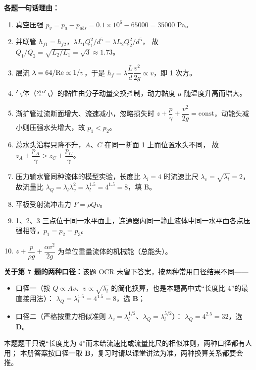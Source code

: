 \begin{tishi}
\textbf{各题一句话理由：}
\begin{enumerate}
  \item 真空压强 $p_v=p_a-p_{abs}=0.1\times10^6-65000=35000$ Pa。
  \item 并联管 $h_{f1}=h_{f2}$，$\lambda L_1Q_1^2/d^5=\lambda L_2Q_2^2/d^5$，
        故 $Q_1/Q_2=\sqrt{L_2/L_1}=\sqrt{3}\approx1.73$。
  \item 层流 $\lambda=64/\mathrm{Re}\propto1/v$，于是 $h_f=\lambda\dfrac{L}{d}\dfrac{v^2}{2g}\propto v$，即 1 次方。
  \item 气体（空气）的黏性由分子动量交换控制，动力黏度 $\mu$ 随温度升高而增大。
  \item 渐扩管过流断面增大、流速减小，忽略损失时
        $z+\dfrac{p}{\gamma}+\dfrac{v^2}{2g}=\text{const}$，动能头减小则压强水头增大，故 $p_1<p_2$。
  \item 总水头沿程只降不升，$A$、$C$ 在同一断面 1 上而位置水头不同，
        故 $z_A+\dfrac{p_A}{\gamma}>z_C+\dfrac{p_C}{\gamma}$。
  \item 压力输水管同种流体的模型实验，长度比 $\lambda_l=4$ 时流速比尺 $\lambda_v=\sqrt{\lambda_l}=2$，
        故流量比 $\lambda_Q=\lambda_l\lambda_v^2=\lambda_l^{1.5}=4^{1.5}=8$，填 B。
  \item 平板受射流冲击力 $F=\rho Qv$。
  \item 1、2、3 三点位于同一水平面上，连通器内同一静止液体中同一水平面各点压强相等，$p_1=p_2=p_3$。
  \item $z+\dfrac{p}{\rho g}+\dfrac{\alpha v^2}{2g}$ 为单位重量流体的机械能（总能头）。
\end{enumerate}
\end{tishi}

\begin{tishi}
\textbf{关于第 7 题的两种口径：}该题 OCR 未留下答案，按两种常用口径结果不同——
\begin{itemize}
  \item 口径一（按 $Q\propto Av$、$v\propto\sqrt{\lambda_l}$ 的简化换算，也是本题高中式“长度比 4”的最直接用法）：
        $\lambda_Q=\lambda_l^{1.5}=4^{1.5}=8$，选 \textbf{B}；
  \item 口径二（严格按重力相似准则 $\lambda_v=\lambda_l^{1/2}$、$\lambda_Q=\lambda_l^{5/2}$）：
        $\lambda_Q=4^{2.5}=32$，选 \textbf{D}。
\end{itemize}
本题题干只说“长度比为 4”而未给流速比或流量比尺的相似准则，两种口径都有人用；
本册答案按口径一取 \textbf{B}，复习时请以课堂讲法为准，两种换算关系都要会推。
\end{tishi}

